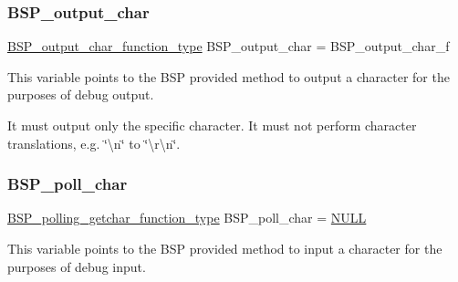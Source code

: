 \subsubsection{\texorpdfstring{BSP\_output\_char}{BSP\_output\_char}}
{\footnotesize\ttfamily \mbox{\hyperlink{bspIo_8h_a0b0dff1c3d35110ae303b4098c60dc14}{B\+S\+P\+\_\+output\+\_\+char\+\_\+function\+\_\+type}} B\+S\+P\+\_\+output\+\_\+char = B\+S\+P\+\_\+output\+\_\+char\+\_\+f}

This variable points to the B\+SP provided method to output a character for the purposes of debug output.

It must output only the specific character. It must not perform character translations, e.\+g. \char`\"{}\textbackslash{}n\char`\"{} to \char`\"{}\textbackslash{}r\textbackslash{}n\char`\"{}. \mbox{\label{printk-dummy_8c_ae5846eecdfa8f2813504371bf01c29b0}} 
\subsubsection{\texorpdfstring{BSP\_poll\_char}{BSP\_poll\_char}}
{\footnotesize\ttfamily \mbox{\hyperlink{bspIo_8h_a132b9ceff428a634ece5dfaac7ef1006}{B\+S\+P\+\_\+polling\+\_\+getchar\+\_\+function\+\_\+type}} B\+S\+P\+\_\+poll\+\_\+char = \mbox{\hyperlink{bestcomm__api_8h_a872bb74de61c3689ccd5b41873fce42c}{N\+U\+LL}}}

This variable points to the B\+SP provided method to input a character for the purposes of debug input. 